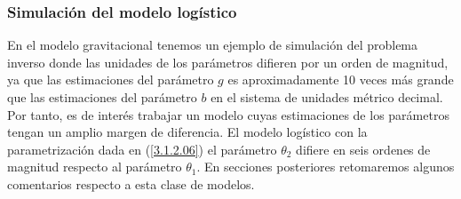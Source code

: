 






\subsubsection{Simulación del modelo logístico}

En el modelo gravitacional tenemos un ejemplo de simulación del problema inverso donde las unidades de los parámetros difieren por un orden de magnitud, ya que las estimaciones del parámetro $g$ es aproximadamente 10 veces más grande que las estimaciones del parámetro $b$ en el sistema de unidades métrico decimal. Por tanto, es de interés trabajar un modelo cuyas estimaciones de los parámetros tengan un amplio margen de diferencia. El modelo logístico con la parametrización dada en (\ref{3.1.2.06}) el parámetro $\theta_2$ difiere en seis ordenes de magnitud respecto al parámetro $\theta_1$. En secciones posteriores retomaremos algunos comentarios respecto a esta clase de modelos.

